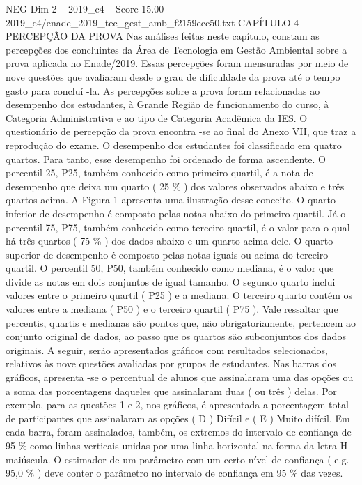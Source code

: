 \begin{textsample}{NEG Dim 2 – 2019\_c4 – Score 15.00 – 2019\_c4/enade\_2019\_tec\_gest\_amb\_f2159ecc50.txt}  \label{ex:f2_neg_385}
CAPÍTULO 4 PERCEPÇÃO DA PROVA Nas análises feitas neste capítulo, constam as percepções dos concluintes da Área de Tecnologia em Gestão Ambiental sobre a prova aplicada no Enade/2019.
Essas percepções foram mensuradas por meio de nove questões que avaliaram desde o grau de dificuldade da prova até o tempo gasto para concluí -la.
As percepções sobre a prova foram relacionadas ao desempenho dos estudantes, à Grande Região de funcionamento do curso, à Categoria Administrativa e ao tipo de Categoria Acadêmica da IES.
O questionário de percepção da prova encontra -se ao final do Anexo VII, que traz a reprodução do exame.
O desempenho dos estudantes foi classificado em quatro quartos.
Para tanto, esse desempenho foi ordenado de forma ascendente.
O percentil 25, P25, também conhecido como primeiro quartil, é a nota de desempenho que deixa um quarto ( 25 \% ) dos valores observados abaixo e três quartos acima.
A Figura 1 apresenta uma ilustração desse conceito.
O quarto inferior de desempenho é composto pelas notas abaixo do primeiro quartil.
Já o percentil 75, P75, também conhecido como terceiro quartil, é o valor para o qual há três quartos ( 75 \% ) dos dados abaixo e um quarto acima dele.
O quarto superior de desempenho é composto pelas notas iguais ou acima do terceiro quartil.
O percentil 50, P50, também conhecido como mediana, é o valor que divide as notas em dois conjuntos de igual tamanho.
O segundo quarto inclui valores entre o primeiro quartil ( P25 ) e a mediana.
O terceiro quarto contém os valores entre a mediana ( P50 ) e o terceiro quartil ( P75 ).
Vale ressaltar que percentis, quartis e medianas são pontos que, não obrigatoriamente, pertencem ao conjunto original de dados, ao passo que os quartos são subconjuntos dos dados originais.
A seguir, serão apresentados gráficos com resultados selecionados, relativos às nove questões avaliadas por grupos de estudantes.
Nas barras dos gráficos, apresenta -se o percentual de alunos que assinalaram uma das opções ou a soma das porcentagens daqueles que assinalaram duas ( ou três ) delas.
Por exemplo, para as questões 1 e 2, nos gráficos, é apresentada a porcentagem total de participantes que assinalaram as opções ( D ) Difícil e ( E ) Muito difícil.
Em cada barra, foram assinalados, também, os extremos do intervalo de confiança de 95 \% como linhas verticais unidas por uma linha horizontal na forma da letra H maiúscula.
O estimador de um parâmetro com um certo nível de confiança ( e.g. 95,0 \% ) deve conter o parâmetro no intervalo de confiança em 95 \% das vezes.

\end{textsample}
